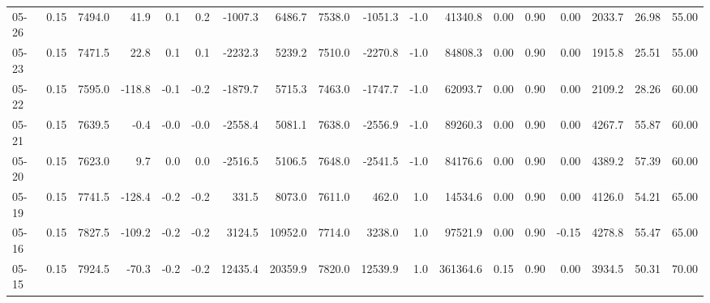 \begin{threeparttable}
{\begin{tabular}{lrrrrrrrrrrrrrrrrr}
  05-26 &     0.15 & 7494.0 &              41.9 &               0.1 &                0.2 &            -1007.3 &  6486.7 & 7538.0 &    -1051.3 &                     -1.0 &             41340.8 &       0.00 &      0.90 &           0.00 &           2033.7 &           26.98 &                  55.00 \\
  05-23 &     0.15 & 7471.5 &              22.8 &               0.1 &                0.1 &            -2232.3 &  5239.2 & 7510.0 &    -2270.8 &                     -1.0 &             84808.3 &       0.00 &      0.90 &           0.00 &           1915.8 &           25.51 &                  55.00 \\
  05-22 &     0.15 & 7595.0 &            -118.8 &              -0.1 &               -0.2 &            -1879.7 &  5715.3 & 7463.0 &    -1747.7 &                     -1.0 &             62093.7 &       0.00 &      0.90 &           0.00 &           2109.2 &           28.26 &                  60.00 \\
  05-21 &     0.15 & 7639.5 &              -0.4 &              -0.0 &               -0.0 &            -2558.4 &  5081.1 & 7638.0 &    -2556.9 &                     -1.0 &             89260.3 &       0.00 &      0.90 &           0.00 &           4267.7 &           55.87 &                  60.00 \\
  05-20 &     0.15 & 7623.0 &               9.7 &               0.0 &                0.0 &            -2516.5 &  5106.5 & 7648.0 &    -2541.5 &                     -1.0 &             84176.6 &       0.00 &      0.90 &           0.00 &           4389.2 &           57.39 &                  60.00 \\
  05-19 &     0.15 & 7741.5 &            -128.4 &              -0.2 &               -0.2 &              331.5 &  8073.0 & 7611.0 &      462.0 &                      1.0 &             14534.6 &       0.00 &      0.90 &           0.00 &           4126.0 &           54.21 &                  65.00 \\
  05-16 &     0.15 & 7827.5 &            -109.2 &              -0.2 &               -0.2 &             3124.5 & 10952.0 & 7714.0 &     3238.0 &                      1.0 &             97521.9 &       0.00 &      0.90 &          -0.15 &           4278.8 &           55.47 &                  65.00 \\
  05-15 &     0.15 & 7924.5 &             -70.3 &              -0.2 &               -0.2 &            12435.4 & 20359.9 & 7820.0 &    12539.9 &                      1.0 &            361364.6 &       0.15 &      0.90 &           0.00 &           3934.5 &           50.31 &                  70.00 \\

\end{tabular}}
\end{threeparttable}
